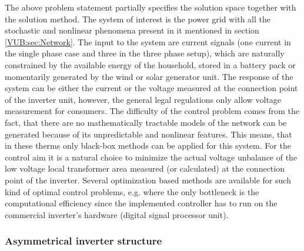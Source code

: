     The above problem statement partially specifies the solution space together with the solution method. The system of interest is the power grid with all the stochastic and nonlinear phenomena present in it mentioned in section \ref{VUB:sec:Network}. The input to the system are current signals (one current in the single phase case and three in the three phase setup), which are naturally constrained by the available energy of the household, stored in a battery pack or momentarily generated by the wind or solar generator unit. The response of the system can be either the current or the voltage measured at the connection point of the inverter unit, however, the general legal regulations only allow voltage measurement for consumers. The difficulty of the control problem comes from the fact, that there are no mathematically tractable models of the network can be generated because of its unpredictable and nonlinear features. This means, that in these therms only black-box methods can be applied for this system.
For the control aim it is a natural choice to minimize the actual voltage unbalance of the low voltage local transformer area measured (or calculated) at the connection point of the inverter. Several optimization based methods are available for such kind of optimal control problems, e.g. \cite{gorbe2012reduction} where the only bottleneck is the computational efficiency since the implemented controller has to run on the commercial inverter's hardware (digital signal processor unit).

    \subsubsection{Asymmetrical inverter structure}\label{VUB:sec:Inverter}

